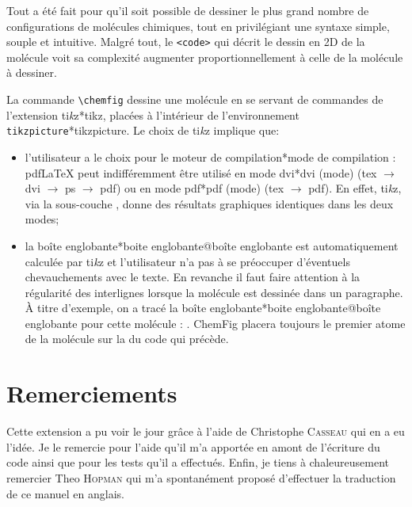\documentclass[10pt]{article}
\makeatletter
\newcommand\idx{\@ifstar{\let\print@or@not\@gobble\idx@}{\let\print@or@not\@firstofone\idx@}}
\newcommand\idx@[1]{%
	\ifcat\expandafter\noexpand\@car#1\@nil\relax%
		\expandafter\ifx\@car#1\@nil\protect
			\index{#1}%
			\print@or@not{#1}%
		\else
			\saveexpandmode\expandarg
			\StrSubstitute{\string#1}{\string @}{\@empty\protect\symbol{'100}}[\temp@]%
			\StrGobbleLeft\temp@1[\temp@]%
			\restoreexpandmode
			\expandafter\index\expandafter{\temp@ @\protect\texttt{\protect\textbackslash\temp@}}%
			\print@or@not{\texttt{\string#1}}%
		\fi
	\else
		\index{#1}%
		\print@or@not{#1}%
	\fi
}
\newcommand\CF{{\ECFAugie ChemFig}\xspace}
\newcommand\TIKZ{ti\textit kz\xspace}
\makeatother
\begin{document}
Tout a été fait pour qu'il soit possible de dessiner le plus grand nombre de configurations de molécules chimiques, tout en privilégiant une syntaxe simple, souple et intuitive. Malgré tout, le \verb-<code>- qui décrit le dessin en 2D de la molécule voit sa complexité augmenter proportionnellement à celle de la molécule à dessiner.

La commande \verb|\chemfig| dessine une molécule en se servant de commandes de l'extension \TIKZ\idx*{tikz}, placées à l'intérieur de l'environnement \verb|tikzpicture|\idx*{tikzpicture}. Le choix de \TIKZ implique que:
\begin{itemize}
\item l'utilisateur a le choix pour le moteur de compilation\idx*{mode de compilation} : pdf\LaTeX{} peut indifféremment être utilisé en mode dvi\idx*{dvi (mode)} (tex $\longrightarrow$ dvi $\longrightarrow$ ps $\longrightarrow$ pdf) ou en mode pdf\idx*{pdf (mode)} (tex $\longrightarrow$ pdf). En effet, \TIKZ, via la sous-couche \idx{pgf}, donne des résultats graphiques identiques dans les deux modes;
\item la boîte englobante\idx*{boite englobante@boîte englobante} est automatiquement calculée par \TIKZ et l'utilisateur n'a pas à se préoccuper d'éventuels chevauchements avec le texte. En revanche il faut faire attention à la régularité des interlignes lorsque la molécule est dessinée dans un paragraphe. À titre d'exemple, on a tracé la boîte englobante\idx*{boite englobante@boîte englobante} pour cette molécule : { }. \CF placera toujours le premier atome de la molécule sur la \idx{ligne de base} du code qui précède.
\end{itemize}

\section{Remerciements}
Cette extension a pu voir le jour grâce à l'aide de Christophe \textsc{Casseau} qui en a eu l'idée. Je le remercie pour l'aide qu'il m'a apportée en amont de l'écriture du code ainsi que pour les tests qu'il a effectués.
\bigbreak
Enfin, je tiens à chaleureusement remercier Theo \textsc{Hopman} qui m'a spontanément proposé d'effectuer la traduction de ce manuel en anglais.
\newpage
\end{document}
